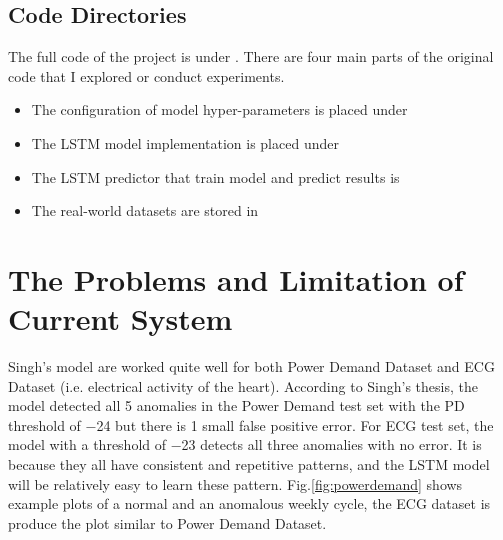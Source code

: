 \documentclass{article}
\begin{document}
\subsection{Code Directories}
The full code of the project is under . There are four main parts
of the original code that I explored or conduct experiments.

\begin{itemize}
	\setlength{\itemsep}{1pt}
	\setlength{\parskip}{0pt}
	\setlength{\parsep}{0pt}
	\item The configuration of model hyper-parameters is placed under
	\item The LSTM model implementation is placed under 
	\item The LSTM predictor that train model and predict results is
	\item The real-world datasets are stored in 
\end{itemize}


\section{The Problems and Limitation of Current System}

Singh's model are worked quite well for both Power Demand Dataset and
ECG Dataset (i.e. electrical activity of the heart). According to Singh's
thesis, the model detected all 5 anomalies in  the Power Demand test set with
the PD threshold of −24 but there is 1 small false positive error. For ECG test
set, the model with a threshold of −23 detects all three anomalies with no
error. It is because they all have consistent and repetitive patterns, and the
LSTM model will be relatively easy to learn these pattern.
Fig.\ref{fig:powerdemand} shows example plots of a normal and an anomalous
weekly cycle, the ECG dataset is produce the plot similar to Power Demand
Dataset.
\end{document}
